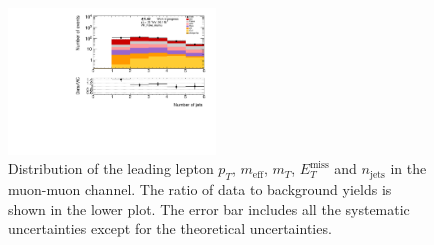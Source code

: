 \begin{figure}[htbp]
\begin{center}
\includegraphics[width=0.49\textwidth]{data/plot/Fake_VR/nJet_VR_Fake_mumu}
\end{center}
\caption{Distribution of the  leading lepton $p_T$, $m_{\text{eff}}$, $m_T$, $E_{T}^{\text{miss}}$ and $n_{\text{jets}}$ in the muon-muon channel. The ratio of data to background yields is shown in the lower plot. The error bar includes all the systematic uncertainties except for the theoretical uncertainties.}
\label{fig:VRSS_fake_mumu}
\end{figure}

